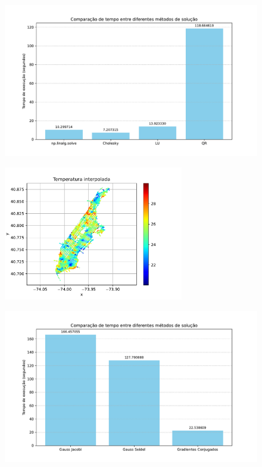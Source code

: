 \documentclass{article}
\begin{document}
    \begin{figure}[ht]
        \centering
        \includegraphics[width=1\textwidth, trim={0 10px 0 25px},clip]{../figs/fig5.pdf}
    \end{figure}

    \newpage

    \begin{figure}[ht]
        \centering
        \includegraphics[width=0.7\textwidth, trim={0 10px 0 25px},clip]{../figs/fig6.pdf}
    \end{figure}

    \begin{figure}[ht]
        \centering
        \includegraphics[width=1\textwidth, trim={0 10px 0 25px},clip]{../figs/fig7.pdf}
    \end{figure}
\end{document}
